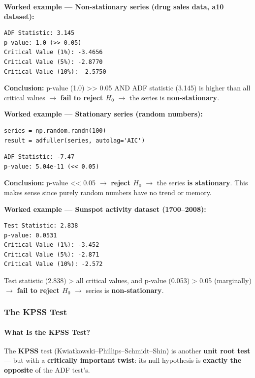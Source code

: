 \documentclass[12pt,openany]{book}
\begin{document}
\textbf{Worked example --- Non-stationary series (drug sales data, a10 dataset):}

\begin{Verbatim}[breaklines=true,breakanywhere=true,fontsize=\small]
ADF Statistic: 3.145
p-value: 1.0 (>> 0.05)
Critical Value (1%): -3.4656
Critical Value (5%): -2.8770
Critical Value (10%): -2.5750
\end{Verbatim}

\textbf{Conclusion:} p-value (1.0) >> 0.05 AND ADF statistic (3.145) is higher than all critical values \(\rightarrow\) \textbf{fail to reject \(H_0\)} \(\rightarrow\) the series is \textbf{non-stationary}.

\textbf{Worked example --- Stationary series (random numbers):}

\begin{Verbatim}[breaklines=true,breakanywhere=true,fontsize=\small]
series = np.random.randn(100)
result = adfuller(series, autolag='AIC')
\end{Verbatim}

\begin{Verbatim}[breaklines=true,breakanywhere=true,fontsize=\small]
ADF Statistic: -7.47
p-value: 5.04e-11 (<< 0.05)
\end{Verbatim}

\textbf{Conclusion:} p-value << 0.05 \(\rightarrow\) \textbf{reject \(H_0\)} \(\rightarrow\) the series \textbf{is stationary}. This makes sense since purely random numbers have no trend or memory.

\textbf{Worked example --- Sunspot activity dataset (1700--2008):}

\begin{Verbatim}[breaklines=true,breakanywhere=true,fontsize=\small]
Test Statistic: 2.838
p-value: 0.0531
Critical Value (1%): -3.452
Critical Value (5%): -2.871
Critical Value (10%): -2.572
\end{Verbatim}

Test statistic (2.838) > all critical values, and p-value (0.053) > 0.05 (marginally) \(\rightarrow\) \textbf{fail to reject \(H_0\)} \(\rightarrow\) series is \textbf{non-stationary}.

\subsubsection{The KPSS Test}

\paragraph{What Is the KPSS Test?}\par\noindent
The \textbf{KPSS} test (Kwiatkowski--Phillips--Schmidt--Shin) is another \textbf{unit root test} --- but with a \textbf{critically important twist}: its null hypothesis is \textbf{exactly the opposite} of the ADF test's.
\end{document}
